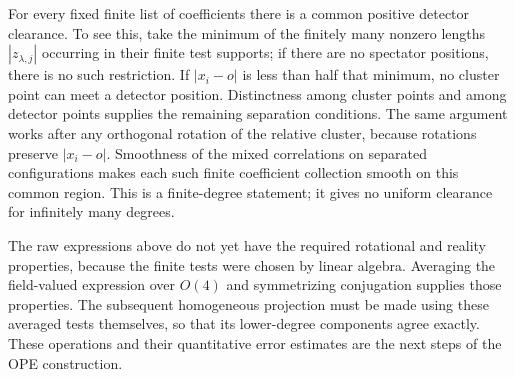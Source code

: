 For every fixed finite list of coefficients there is a common positive
detector clearance. To see this, take the minimum of the finitely many
nonzero lengths $|z_{\lambda,j}|$ occurring in their finite test supports;
if there are no spectator positions, there is no such restriction.
If $|x_i-o|$ is less than half that minimum, no cluster point can meet a
detector position. Distinctness among cluster points and among detector
points supplies the remaining separation conditions. The same argument
works after any orthogonal rotation of the relative cluster, because
rotations preserve $|x_i-o|$. Smoothness of the mixed correlations on
separated configurations makes each such finite coefficient collection
smooth on this common region. This is a finite-degree statement; it gives
no uniform clearance for infinitely many degrees.

The raw expressions above do not yet have the required rotational and
reality properties, because the finite tests were chosen by linear
algebra. Averaging the field-valued expression over $O(4)$ and symmetrizing
conjugation supplies those properties. The subsequent homogeneous
projection must be made using these averaged tests themselves, so that
its lower-degree components agree exactly. These operations and their
quantitative error estimates are the next steps of the OPE construction.
